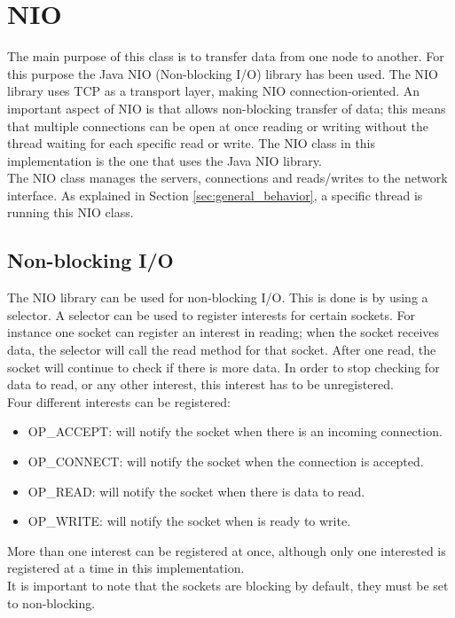 \documentclass[11pt]{article}
\begin{document}
		
\section{NIO}
	The main purpose of this class is to transfer data from one node to another. For this purpose the Java NIO (Non-blocking I/O) library has been used. The NIO library uses TCP as a transport layer, making NIO connection-oriented. An important aspect of NIO is that allows non-blocking transfer of data; this means that multiple connections can be open at once reading or writing without the thread waiting for each specific read or write. The NIO class in this implementation is the one that uses the Java NIO library.\\
	The NIO class manages the servers, connections and reads/writes to the network interface. As explained in Section \ref{sec:general_behavior}, a specific thread is running this NIO class.
	
	\subsection{Non-blocking I/O}
	The NIO library can be used for non-blocking I/O. This is done is by using a selector. A selector can be used to register interests for certain sockets. For instance one socket can register an interest in reading; when the socket receives data, the selector will call the read method for that socket. After one read, the socket will continue to check if there is more data. In order to stop checking for data to read, or any other interest, this interest has to be unregistered.\\
	Four different interests can be registered:
	 \begin{itemize}
		\item OP\_ACCEPT: will notify the socket when there is an incoming connection.
		\item OP\_CONNECT: will notify the socket when the connection is accepted.
		\item OP\_READ: will notify the socket when there is data to read.
		\item OP\_WRITE: will notify the socket when is ready to write.
	\end{itemize}
	More than one interest can be registered at once, although only one interested is registered at a time in this implementation.\\
	It is important to note that the sockets are blocking by default, they must be set to non-blocking.
\end{document}
